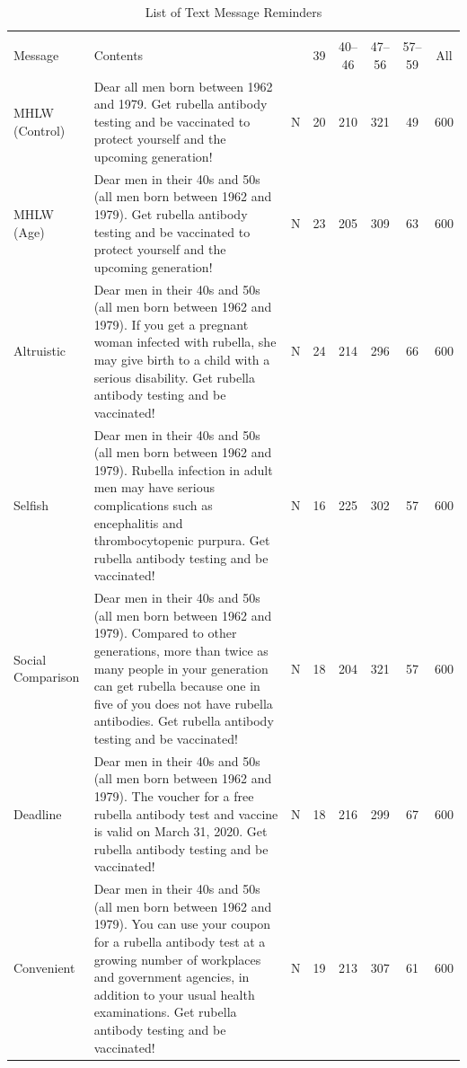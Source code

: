 \documentclass[
]{article}
\begin{document}
\begin{table}

\caption{\label{tab:message-list}List of Text Message Reminders}
\centering
\fontsize{9}{11}\selectfont
\begin{tabular}[t]{l>{\raggedright\arraybackslash}p{20em}cccccc}
\toprule
\multicolumn{3}{c}{ } & \multicolumn{4}{c}{Age (as of Apr 2019)} & \multicolumn{1}{c}{ } \\
\cmidrule(l{3pt}r{3pt}){4-7}
Message & Contents &   & 39 & 40--46 & 47--56 & 57--59 & All\\
\midrule
MHLW (Control) & Dear all men born between 1962 and 1979. Get rubella antibody testing and be vaccinated to protect yourself and the upcoming generation! & N & 20 & 210 & 321 & 49 & 600\\
\addlinespace
MHLW (Age) & Dear men in their 40s and 50s (all men born between 1962 and 1979). Get rubella antibody testing and be vaccinated to protect yourself and the upcoming generation! & N & 23 & 205 & 309 & 63 & 600\\
\addlinespace
Altruistic & Dear men in their 40s and 50s (all men born between 1962 and 1979). If you get a pregnant woman infected with rubella, she may give birth to a child with a serious disability. Get rubella antibody testing and be vaccinated! & N & 24 & 214 & 296 & 66 & 600\\
\addlinespace
Selfish & Dear men in their 40s and 50s (all men born between 1962 and 1979). Rubella infection in adult men may have serious complications such as encephalitis and thrombocytopenic purpura. Get rubella antibody testing and be vaccinated! & N & 16 & 225 & 302 & 57 & 600\\
\addlinespace
Social Comparison & Dear men in their 40s and 50s (all men born between 1962 and 1979). Compared to other generations, more than twice as many people in your generation can get rubella because one in five of you does not have rubella antibodies. Get rubella antibody testing and be vaccinated! & N & 18 & 204 & 321 & 57 & 600\\
\addlinespace
Deadline & Dear men in their 40s and 50s (all men born between 1962 and 1979). The voucher for a free rubella antibody test and vaccine is valid on March 31, 2020. Get rubella antibody testing and be vaccinated! & N & 18 & 216 & 299 & 67 & 600\\
\addlinespace
Convenient & Dear men in their 40s and 50s (all men born between 1962 and 1979). You can use your coupon for a rubella antibody test at a growing number of workplaces and government agencies, in addition to your usual health examinations. Get rubella antibody testing and be vaccinated! & N & 19 & 213 & 307 & 61 & 600\\
\bottomrule
\end{tabular}
\end{table}
\end{document}
